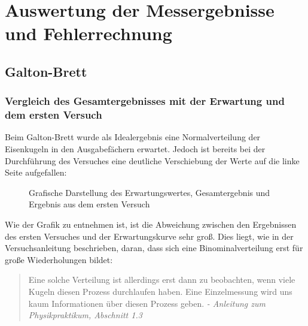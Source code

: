 \newpage
\section{ Auswertung der Messergebnisse und Fehlerrechnung}

\subsection{Galton-Brett}
\subsubsection{Vergleich des Gesamtergebnisses mit der Erwartung und dem ersten Versuch}
Beim Galton-Brett wurde als Idealergebnis eine Normalverteilung der Eisenkugeln in den Ausgabefächern erwartet. Jedoch ist bereits bei der Durchführung des Versuches eine deutliche Verschiebung der Werte auf die linke Seite aufgefallen:

\begin{figure}[htb]
    \centering
    
    \caption[Grafische Darstellung der Verteilung]{Grafische Darstellung des Erwartungswertes, Gesamtergebnis und Ergebnis aus dem ersten Versuch}
\end{figure}

Wie der Grafik zu entnehmen ist, ist die Abweichung zwischen den Ergebnissen des ersten Versuches und der Erwartungskurve sehr groß. Dies liegt, wie in der Versuchsanleitung beschrieben, daran, dass sich eine Binominalverteilung erst für große Wiederholungen bildet:
\begin{quotation}
    \centering
    \glqq Eine solche Verteilung ist allerdings erst dann zu beobachten, wenn viele Kugeln diesen Prozess durchlaufen haben. Eine Einzelmessung wird uns kaum Informationen über diesen Prozess geben.\grqq 
    \newline \textit{- Anleitung zum Physikpraktikum, Abschnitt 1.3}
\end{quotation}

\begin{table}[htb]
    \centering
    \caption{Darstellung der Differenz zwischen Erwartung und Ergebnis}
\end{table}


